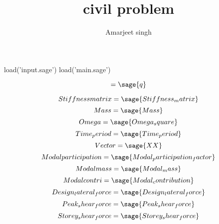 \documentclass[12pt]{report}
\title{civil problem}
\author{Amarjeet singh }
\begin{document}
\thispagestyle{plain}
	\begin{titlepage}
\maketitle
	\end{titlepage}
\begin{sagesilent}
load('input.sage')
load('main.sage')


\end{sagesilent}
\begin{equation}
	[ Stiffness_matrix - w^2M]=\sage{q}
\end{equation}

\begin{equation}
Stiffnessmatrix=\sage{Stiffness_matrix}
\end{equation}
\begin{equation}
Mass=\sage{Mass}
\end{equation}
\begin{equation}
Omega=\sage{Omega_square}
\end{equation}
\begin{equation}Time_period=\sage{Time_period}
\end{equation}
\begin{equation}Vector=\sage{XX}
\end{equation}
\begin{equation}
Modalparticipation=\sage{Modal_participation_factor}
\end{equation}
\begin{equation}
Modalmass=\sage{Modal_mass}
\end{equation}
\begin{equation}
Modalcontri=\sage{Modal_contribution}
\end{equation}
\begin{equation}
Design_lateral_force=\sage{Design_lateral_force}
\end{equation}
\begin{equation}
Peak_shear_force=\sage{Peak_shear_force}
\end{equation}
\begin{equation}
Storey_shear_force=\sage{Storey_shear_force}
\end{equation}
\end{document}
